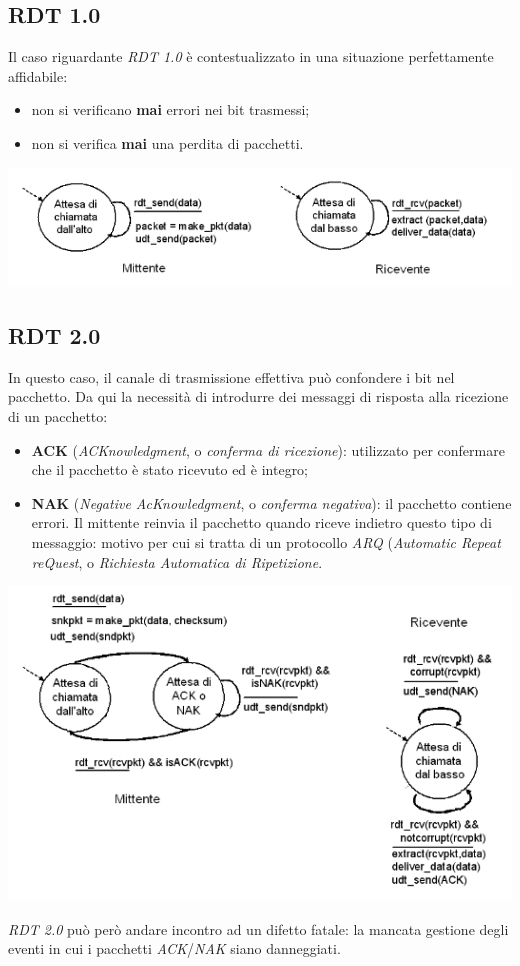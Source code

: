 \subsection{RDT 1.0}
Il caso riguardante \textit{RDT 1.0} è contestualizzato in una situazione perfettamente affidabile:
\begin{itemize}
    \item non si verificano \textbf{mai} errori nei bit trasmessi;
    \item non si verifica \textbf{mai} una perdita di pacchetti.
\end{itemize}
\begin{center}
    \includegraphics[width=.7\textwidth]{res/fsm-rdt-10.jpg} \hfill
\end{center}
\newpage

\subsection{RDT 2.0}
In questo caso, il canale di trasmissione effettiva può confondere i bit nel pacchetto. Da qui la necessità di introdurre dei messaggi di risposta alla ricezione di un pacchetto:
\begin{itemize}
    \item \textbf{ACK} (\textit{ACKnowledgment}, o \textit{conferma di ricezione}): utilizzato per confermare che il pacchetto è stato ricevuto ed è integro;
    \item \textbf{NAK} (\textit{Negative AcKnowledgment}, o \textit{conferma negativa}): il pacchetto contiene errori. Il mittente reinvia il pacchetto quando riceve indietro questo tipo di messaggio: motivo per cui si tratta di un protocollo \textit{ARQ} (\textit{Automatic Repeat reQuest}, o \textit{Richiesta Automatica di Ripetizione}.
\end{itemize}
\begin{center}
    \includegraphics[width=.7\textwidth]{res/fsm-rdt-20.jpg} \hfill
\end{center}
\textit{RDT 2.0} può però andare incontro ad un difetto fatale: la mancata gestione degli eventi in cui i pacchetti \textit{ACK}/\textit{NAK} siano danneggiati.

